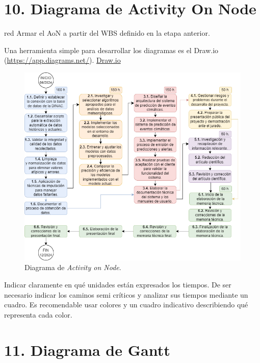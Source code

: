 \documentclass[
11pt, %
codirector, %
]{charter}
\begin{document}
\section{10. Diagrama de Activity On Node}
\label{sec:AoN}

\begin{consigna}{red}
Armar el AoN a partir del WBS definido en la etapa anterior.

Una herramienta simple para desarrollar los diagramas es el Draw.io (\url{https://app.diagrams.net/}).
\href{https://app.diagrams.net}{Draw.io}


\begin{figure}[htpb]
\centering 
\includegraphics[width=.8\textwidth]{./Figuras/AoN.png}
\caption{Diagrama de \textit{Activity on Node}.}
\label{fig:AoN}
\end{figure}

Indicar claramente en qué unidades están expresados los tiempos.
De ser necesario indicar los caminos semi críticos y analizar sus tiempos mediante un cuadro.
Es recomendable usar colores y un cuadro indicativo describiendo qué representa cada color.

\end{consigna}

\section{11. Diagrama de Gantt}
\label{sec:gantt}
\end{document}
